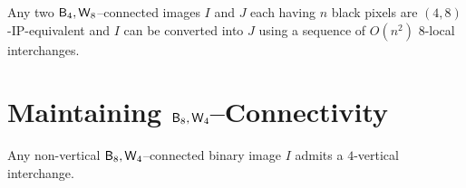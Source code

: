 \documentclass[lotsofwhite,charterfonts]{patmorin}
\newcommand{\foureight}{\ensuremath{\protect\textup{\textsf{B}}_{4},\protect\textup{\textsf{W}}_{8}}}
\newcommand{\eightfour}{\ensuremath{\protect\textup{\textsf{B}}_{8},\protect\textup{\textsf{W}}_{4}}}
\begin{document}
\begin{thm}
Any two \foureight--connected images $I$ and $J$ each having $n$ black
pixels are $(4,8)$-IP-equivalent and $I$ can be converted into $J$ using a
sequence of $O(n^2)$ 8-local interchanges.
\end{thm}
 



\section{Maintaining \eightfour--Connectivity}


\begin{lem}
Any  non-vertical $\eightfour$--connected binary image $I$ admits a $4$-vertical interchange.
\end{lem}
\end{document}
